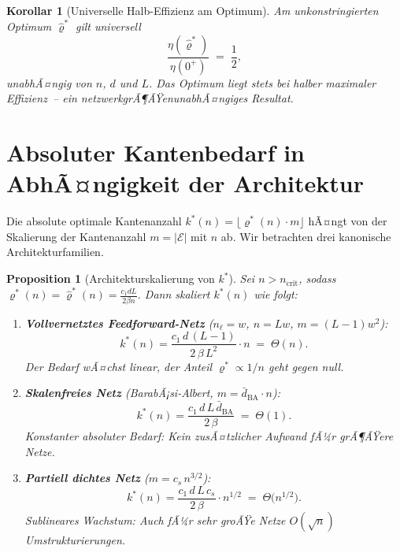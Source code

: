 ﻿\documentclass[12pt, a4paper, openany]{report}
\newtheorem{proposition}[theorem]{Proposition}
\newtheorem{corollary}[theorem]{Korollar}
\newcommand{\calE}{\mathcal{E}}
\begin{document}
\begin{corollary}[Universelle Halb-Effizienz am Optimum]
\label{cor:half_efficiency}
Am unkonstringierten Optimum $\hat\varrho^*$ gilt universell
\[
  \frac{\eta(\hat\varrho^*)}{\eta(0^+)} \;=\; \frac{1}{2},
\]
unabhÃ¤ngig von $n$, $d$ und $L$.  Das Optimum liegt stets bei halber
maximaler Effizienz~-- ein netzwerkgrÃ¶ÃŸenunabhÃ¤ngiges Resultat.
\end{corollary}

\section{Absoluter Kantenbedarf in AbhÃ¤ngigkeit der Architektur}
\label{sec:scaling_arch}

Die absolute optimale Kantenanzahl $k^*(n) = \lfloor\varrho^*(n)\cdot m\rfloor$
hÃ¤ngt von der Skalierung der Kantenanzahl $m = |\calE|$ mit $n$ ab.  Wir
betrachten drei kanonische Architekturfamilien.

\begin{proposition}[Architekturskalierung von $k^*$]
\label{prop:arch_scaling}
Sei $n > n_{\mathrm{crit}}$, sodass $\varrho^*(n) = \hat\varrho^*(n)
= \frac{c_1 dL}{2\beta n}$.  Dann skaliert $k^*(n)$ wie folgt:
\begin{enumerate}[label=(\roman*)]
  \item \textbf{Vollvernetztes Feedforward-Netz} ($n_\ell = w$, $n = Lw$,
    $m = (L-1)w^2$):
    \begin{equation}
      \label{eq:k_dense}
      k^*(n) = \frac{c_1\,d\,(L-1)}{2\,\beta\,L^2}\cdot n
      \;=\; \Theta(n).
    \end{equation}
    Der Bedarf wÃ¤chst \emph{linear}, der Anteil $\varrho^* \propto 1/n$ geht
    gegen null.
  \item \textbf{Skalenfreies Netz} (BarabÃ¡si-Albert, $m = \bar{d}_{\mathrm{BA}}\cdot n$):
    \begin{equation}
      \label{eq:k_sparse}
      k^*(n) = \frac{c_1\,d\,L\,\bar{d}_{\mathrm{BA}}}{2\,\beta}
      \;=\; \Theta(1).
    \end{equation}
    Konstanter absoluter Bedarf: Kein zusÃ¤tzlicher Aufwand fÃ¼r grÃ¶ÃŸere Netze.
  \item \textbf{Partiell dichtes Netz} ($m = c_s\,n^{3/2}$):
    \begin{equation}
      \label{eq:k_semi}
      k^*(n) = \frac{c_1\,d\,L\,c_s}{2\,\beta}\cdot n^{1/2}
      \;=\; \Theta\!\bigl(n^{1/2}\bigr).
    \end{equation}
    Sublineares Wachstum: Auch fÃ¼r sehr groÃŸe Netze $O(\sqrt{n})$
    Umstrukturierungen.
\end{enumerate}
\end{proposition}
\end{document}
